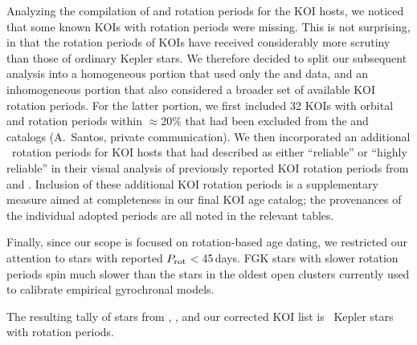 \documentclass[11pt,twocolumn,tighten]{aastex63}
\begin{document}
Analyzing the compilation of  and
 rotation periods for the KOI hosts, we
noticed that some known KOIs with rotation periods were missing.
This is not surprising, in that the rotation periods of KOIs have
received considerably more scrutiny than those of ordinary Kepler
stars.
We therefore decided to split our subsequent analysis into a
homogeneous portion that used only the  and
 data, and an inhomogeneous portion that also
considered a broader set of available KOI rotation periods.
For the latter portion, we first included 32 KOIs with orbital and
rotation periods within $\approx$20\% that had been
excluded %
from the
 and  catalogs
(A.~Santos, private communication).
We then incorporated an additional \nnewdavidtwentyone\ rotation
periods for KOI hosts that
\citet{David_2021} had described as either ``reliable'' or ``highly
reliable'' in their visual analysis of previously reported KOI
rotation periods from \citet{McQuillan_2013,Walkowicz_2013,Mazeh_2015}
and \citet{Angus_2018}.
Inclusion of these additional KOI rotation periods is a
supplementary measure aimed at completeness in our final KOI age
catalog; the provenances of the individual adopted periods are all
noted in the relevant tables.

Finally, since our scope is focused on rotation-based age dating, 
we restricted our attention to stars with reported $P_{\rm
rot}$$<$45\,days.
FGK stars with slower rotation periods spin much slower than the stars
in the oldest open clusters currently used to calibrate empirical
gyrochronal models.

The resulting tally of stars from
, , and our corrected
KOI list is \nuniqstarsantosrot\ Kepler stars with rotation periods.
\end{document}
